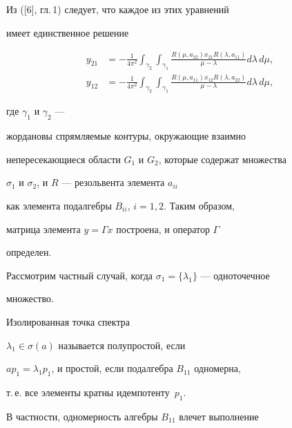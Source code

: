 Из ([6], гл.\,1) следует, что каждое из этих уравнений


имеет единственное решение


\begin{align*}


y_{21}&=-\frac1{4\pi^2}\int_{\gamma_2}\int_{\gamma_1}


\frac{R(\mu,a_{22})x_{21}R(\lambda,a_{11})}{\mu-\lambda}d\lambda\, d\mu,\\


%


y_{12}&=-\frac1{4\pi^2}\int_{\gamma_2}


\int_{\gamma_1}\frac {R(\mu,a_{11})x_{12}R(\lambda,a_{22})}


{\mu-\lambda} d\lambda\,d\mu,


\end{align*}


где $\gamma_1$ и $\gamma_2$ ---


жордановы спрямляемые контуры, окружающие взаимно


непересекающиеся области $G_1$ и $G_2$, которые содержат множества


$\sigma_1$ и $\sigma_2$, и  $R$ --- резольвента элемента $a_{ii}$


как элемента подалгебры $B_{ii}$, $i=1,2$.  Таким образом,


матрица элемента $y=\Gamma x$ построена, и оператор $\Gamma$


определен.





Рассмотрим частный случай, когда $\sigma_1=\{\lambda_1\}$ --- одноточечное


множество.








\begin{defn}


Изолированная точка спектра


$\lambda_1\in\sigma(a)$ называется полупростой, если


$ap_1=\lambda_1p_1$, и простой, если подалгебра $B_{11}$ одномерна,


т.\,е. все элементы кратны идемпотенту~$p_1$.


\end{defn}





В частности, одномерность алгебры  $B_{11}$ влечет выполнение


